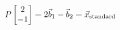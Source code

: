 \documentclass[preview]{standalone}
\begin{document}
\begin{align*}
P\begin{bmatrix}2\\-1\end{bmatrix}=2\vec b_1-\vec b_2=\vec x_{\rm standard}
\end{align*}
\end{document}
